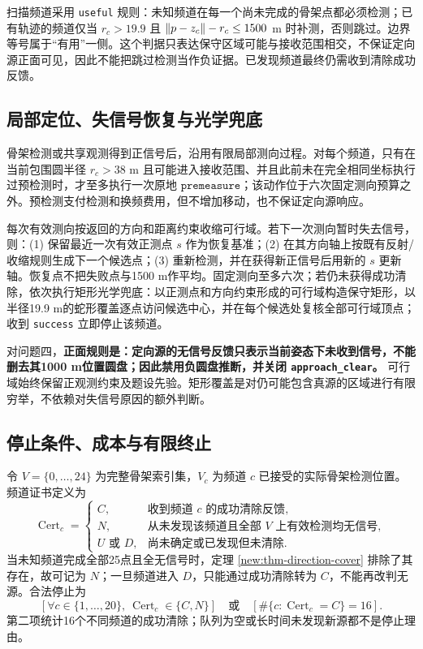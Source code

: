 扫描频道采用 \texttt{useful} 规则：未知频道在每一个尚未完成的骨架点都必须检测；已有轨迹的频道仅当 $r_c>19.9$ 且 $\left\lVert p-z_c\right\rVert-r_c\le1500$ m 时补测，否则跳过。边界等号属于“有用”一侧。这个判据只表达保守区域可能与接收范围相交，不保证定向源正面可见，因此不能把跳过检测当作负证据。已发现频道最终仍需收到清除成功反馈。

\subsection{局部定位、失信号恢复与光学兜底}

骨架检测或共享观测得到正信号后，沿用有限局部测向过程。对每个频道，只有在当前包围圆半径 $r_c>38$ m 且可能进入接收范围、并且此前未在完全相同坐标执行过预检测时，才至多执行一次原地 $\texttt{premeasure}$；该动作位于六次固定测向预算之外。预检测支付检测和换频费用，但不增加移动，也不保证定向源响应。

每次有效测向按返回的方向和距离约束收缩可行域。若下一次测向暂时失去信号，则：(1) 保留最近一次有效正测点 $s$ 作为恢复基准；(2) 在其方向轴上按既有反射/收缩规则生成下一个候选点；(3) 重新检测，并在获得新正信号后用新的 $s$ 更新轴。恢复点不把失败点与1500 m作平均。固定测向至多六次；若仍未获得成功清除，依次执行矩形光学兜底：以正测点和方向约束形成的可行域构造保守矩形，以半径19.9 m的蛇形覆盖逐点访问候选中心，并在每个候选处复核全部可行域顶点；收到 \texttt{success} 立即停止该频道。

对问题四，\textbf{正面规则是：定向源的无信号反馈只表示当前姿态下未收到信号，不能删去其1000 m位置圆盘；因此禁用负圆盘推断，并关闭 \texttt{approach\_clear}。} 可行域始终保留正观测约束及题设先验。矩形覆盖是对仍可能包含真源的区域进行有限穷举，不依赖对失信号原因的额外判断。

\subsection{停止条件、成本与有限终止}

令 $V=\{0,\ldots,24\}$ 为完整骨架索引集，$V_c$ 为频道 $c$ 已接受的实际骨架检测位置。频道证书定义为
\begin{equation}
 \operatorname{Cert}_c=
 \begin{cases}
 C,&\text{收到频道 $c$ 的成功清除反馈},\\
 N,&\text{从未发现该频道且全部 $V$ 上有效检测均无信号},\\
 U\text{ 或 }D,&\text{尚未确定或已发现但未清除}.
 \end{cases}
 \label{q4:eq-stop-cert}
\end{equation}
当未知频道完成全部25点且全无信号时，定理 \ref{new:thm-direction-cover} 排除了其存在，故可记为 $N$；一旦频道进入 $D$，只能通过成功清除转为 $C$，不能再改判无源。合法停止为
\begin{equation}
 \left[\forall c\in\{1,\ldots,20\},\ \operatorname{Cert}_c\in\{C,N\}\right]
 \quad\text{或}\quad
 \left[\#\{c:\operatorname{Cert}_c=C\}=16\right].
\end{equation}
第二项统计16个不同频道的成功清除；队列为空或长时间未发现新源都不是停止理由。

